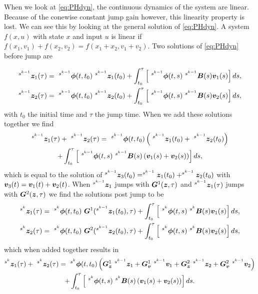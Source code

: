 \documentclass[../DC2017114Bouma.tex]{subfiles}
\begin{document}
When we look at \eqref{eq:PHdyn}, the continuous dynamics of the system are linear. Because of the conewise constant jump gain however, this linearity property is lost. We can see this by looking at the general solution of \eqref{eq:PHdyn}. A system $f(x,u)$ with state $x$ and input $u$ is linear if $f(x_1,v_1) + f(x_2,v_2) = f(x_1+x_2,v_1+v_2)$. Two solutions of \eqref{eq:PHdyn} before jump are

\begin{align}
^{s^{k-1}}\zb_1(\tau) &= \ ^{s^{k-1}}\phib(t,t_0)\ ^{s^{k-1}}\zb_1(t_0) + \int_{t_0}^\tau \left[\ ^{s^{k-1}}\phib(t,s)\ ^{s^{k-1}}\Bb(s)\vb_1(s)\right]ds,\\
^{s^{k-1}}\zb_2(\tau) &= \ ^{s^{k-1}}\phib(t,t_0)\ ^{s^{k-1}}\zb_2(t_0) + \int_{t_0}^\tau \left[\ ^{s^{k-1}}\phib(t,s)\ ^{s^{k-1}}\Bb(s)\vb_2(s)\right]ds,
\end{align}
with $t_0$ the initial time and $\tau$ the jump time.
When we add these solutions together we find
\begin{multline}
^{s^{k-1}}\zb_1(\tau) + \ ^{s^{k-1}}\zb_2(\tau) = \ ^{s^{k-1}}\phib(t,t_0)\left(\ ^{s^{k-1}}\zb_1(t_0) + \ ^{s^{k-1}}\zb_2(t_0)\right) \\+ \int_{t_0}^\tau \left[\ ^{s^{k-1}}\phib(t,s)\ ^{s^{k-1}}\Bb(s)\left(\vb_1(s) + \vb_2(s)\right)\right]ds,
\end{multline}
which is equal to the solution of $^{s^{k-1}}{\boldsymbol{z}}_3(t_0) = ^{s^{k-1}}{\boldsymbol{z}}_1(t_0) + ^{s^{k-1}}{\boldsymbol{z}}_2(t_0)$ with ${\boldsymbol{v}}_3(t) = {\boldsymbol{v}}_1(t) + {\boldsymbol{v}}_2(t)$. When $^{s^{k-1}}{\boldsymbol{z}}_1$ jumps with ${\boldsymbol{G}}^1({\boldsymbol{z}},\tau)$ and $^{s^{k-1}}{\boldsymbol{z}}_1(\tau)$ jumps with ${\boldsymbol{G}}^2({\boldsymbol{z}},\tau)$ we find the solutions post jump to be
\begin{align}
^{s^{k}}\zb_1(\tau) &= \ ^{s^{k}}\phib(t,t_0)\ \Gb^1(^{s^{k-1}}\zb_1(t_0),\tau) + \int_{t_0}^\tau \left[\ ^{s^{k}}\phib(t,s)\ ^{s^{k}}\Bb(s)\vb_1(s)\right]ds,\label{eq:z1sol}\\
^{s^{k}}\zb_2(\tau) &= \ ^{s^{k}}\phib(t,t_0)\ \Gb^2(^{s^{k-1}}\zb_2(t_0),\tau) + \int_{t_0}^\tau \left[\ ^{s^{k}}\phib(t,s)\ ^{s^{k}}\Bb(s)\vb_2(s)\right]ds,
\end{align}
which when added together results in
\begin{multline}
^{s^{k}}\zb_1(\tau) + \ ^{s^{k}}\zb_2(\tau) = \ ^{s^{k}}\phib(t,t_0)\left(\Gb_\zb^1 \ ^{s^{k-1}}\zb_1 + \Gb_\vb^1\ ^{s^{k-1}}\vb_1 + \Gb_\zb^2 \ ^{s^{k-1}}\zb_2 + \Gb_\vb^2\ ^{s^{k-1}}\vb_2\right) \\+ \int_{t_0}^\tau \left[\ ^{s^{k}}\phib(t,s)\ ^{s^{k}}\Bb(s)\left(\vb_1(s) + \vb_2(s)\right)\right]ds.\label{eq:soladd}
\end{multline}
\end{document}
